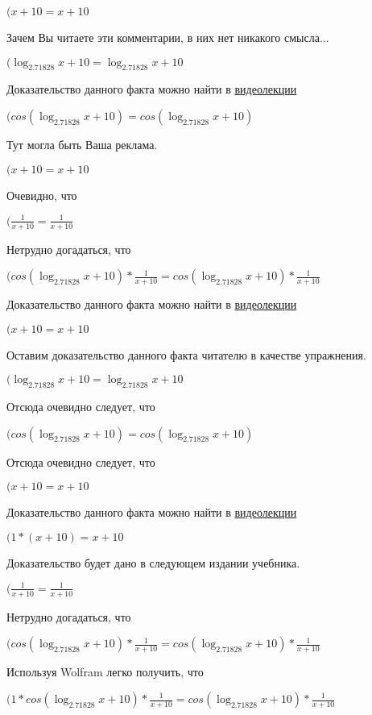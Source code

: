 \documentclass[12pt,a4paper,fleqn]{article}
\theoremstyle{definition}
\begin{document}
$( x  +  10  =  x  +  10 $

Зачем Вы читаете эти комментарии, в них нет никакого смысла...

$(\log_{ 2.71828 }{ x  +  10 } = \log_{ 2.71828 }{ x  +  10 }$

Доказательство данного факта можно найти в \href{https://www.youtube.com/watch?v=dQw4w9WgXcQ}{видеолекции}

$(cos(\log_{ 2.71828 }{ x  +  10 }) = cos(\log_{ 2.71828 }{ x  +  10 })$

Тут могла быть Ваша реклама.

$( x  +  10  =  x  +  10 $

Очевидно, что

$(\frac{ 1 }{ x  +  10 }
 = \frac{ 1 }{ x  +  10 }
$

Нетрудно догадаться, что

$(cos(\log_{ 2.71828 }{ x  +  10 }) * \frac{ 1 }{ x  +  10 }
 = cos(\log_{ 2.71828 }{ x  +  10 }) * \frac{ 1 }{ x  +  10 }
$

Доказательство данного факта можно найти в \href{https://www.youtube.com/watch?v=dQw4w9WgXcQ}{видеолекции}

$( x  +  10  =  x  +  10 $

Оставим доказательство данного факта читателю в качестве упражнения.

$(\log_{ 2.71828 }{ x  +  10 } = \log_{ 2.71828 }{ x  +  10 }$

Отсюда очевидно следует, что

$(cos(\log_{ 2.71828 }{ x  +  10 }) = cos(\log_{ 2.71828 }{ x  +  10 })$

Отсюда очевидно следует, что

$( x  +  10  =  x  +  10 $

Доказательство данного факта можно найти в \href{https://www.youtube.com/watch?v=dQw4w9WgXcQ}{видеолекции}

$( 1  * ( x  +  10 ) =  x  +  10 $

Доказательство будет дано в следующем издании учебника.

$(\frac{ 1 }{ x  +  10 }
 = \frac{ 1 }{ x  +  10 }
$

Нетрудно догадаться, что

$(cos(\log_{ 2.71828 }{ x  +  10 }) * \frac{ 1 }{ x  +  10 }
 = cos(\log_{ 2.71828 }{ x  +  10 }) * \frac{ 1 }{ x  +  10 }
$

Используя Wolfram легко получить, что

$( 1  * cos(\log_{ 2.71828 }{ x  +  10 }) * \frac{ 1 }{ x  +  10 }
 = cos(\log_{ 2.71828 }{ x  +  10 }) * \frac{ 1 }{ x  +  10 }
$
\end{document}
